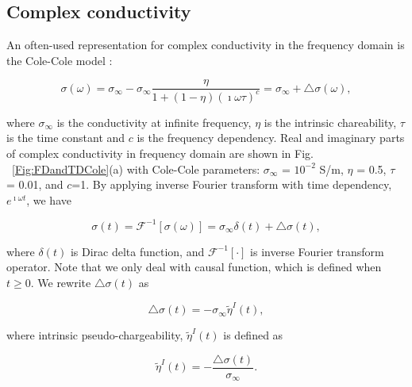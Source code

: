 \documentclass[letterpaper,11pt]{article}
\newcommand{\siginf}{\sigma_\infty}
\newcommand{\dsig}{\triangle\sigma}
\newcommand{\peta}{\tilde{\eta}}
\begin{document}

\subsection{Complex conductivity}
An often-used representation for complex conductivity in the frequency domain is the Cole-Cole model \cite[]{COLE}:
\begin{linenomath*}
\begin{equation}
  \sigma(\omega) = \sigma_{\infty} - \sigma_{\infty}\frac{\eta}{1+(1-\eta)(\imath\omega\tau)^c} = \sigma_{\infty} + \triangle\sigma(\omega),
  \label{eq: sigma_freq}
\end{equation}
\end{linenomath*}
where $\sigma_{\infty}$ is the conductivity at infinite frequency, $\eta$ is the intrinsic chareability, $\tau$ is the time constant and $c$ is the frequency dependency. Real and imaginary parts of complex conductivity in frequency domain are shown in Fig. ~\ref{Fig:FDandTDCole}(a) with Cole-Cole parameters: $\siginf$ = $10^{-2}$ S/m, $\eta $ = 0.5, $\tau$ = 0.01, and $c$=1. By applying inverse Fourier transform with time dependency, $e^{\imath\omega t}$, we have
\begin{linenomath*}
\begin{equation}
  \sigma(t) = \mathscr{F}^{-1}[\sigma(\omega)] = \sigma_{\infty}\delta(t) + \triangle\sigma(t),
  \label{eq: sigma_time}
\end{equation}
\end{linenomath*}
where $\delta(t)$ is Dirac delta function, and $\mathscr{F}^{-1}[\cdot]$ is inverse Fourier transform operator. Note that we only deal with causal function, which is defined when $t\ge 0$. 
We rewrite $\dsig(t)$ as 
\begin{linenomath*}
\begin{equation}
  \dsig(t) = - \siginf\peta^{I}(t),
  \label{eq: sigma_time_c1}
\end{equation}
\end{linenomath*}
where intrinsic pseudo-chargeability, $\peta^{I}(t)$ is defined as
\begin{linenomath*}
\begin{equation}
    \peta^{I}(t) = -\frac{\dsig(t)}{\siginf}. %
    \label{eq: intrinsic_peta}
\end{equation}
\end{linenomath*}
\end{document}
